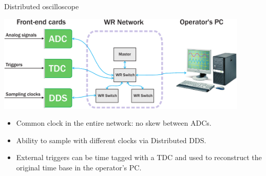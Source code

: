 \documentclass[compress,red]{beamer}
\begin{document}
\begin{frame}{Distributed oscilloscope}
  \begin{center}
    \includegraphics[width=0.9\textwidth]{../../figures/applications/distr_oscill.pdf}
    \end{center}
    \begin{block}{}
      \begin{itemize}
      \item Common clock in the entire network: no skew between ADCs.
      \item Ability to sample with different clocks via Distributed DDS.
      \item External triggers can be time tagged with a TDC and used to reconstruct the original time base in the operator's PC.
      \end{itemize}
    \end{block}
\end{frame}
\end{document}
